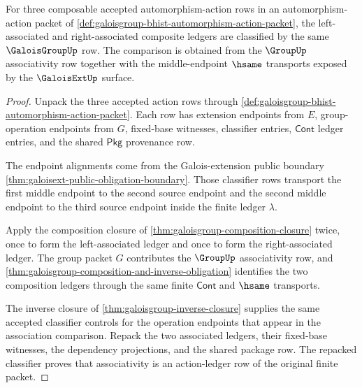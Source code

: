 \begin{theorem}
\label{thm:galoisgroup-associative-composition-row}
For three composable accepted automorphism-action rows in an
automorphism-action packet of
\autoref{def:galoisgroup-bhist-automorphism-action-packet}, the left-associated
and right-associated composite ledgers are classified by the same
$\GaloisGroupUp$ row. The comparison is obtained from the $\GroupUp$
associativity row together with the middle-endpoint $\hsame$ transports exposed
by the $\GaloisExtUp$ surface.
\end{theorem}
\begin{proof}
Unpack the three accepted action rows through
\autoref{def:galoisgroup-bhist-automorphism-action-packet}. Each row has
extension endpoints from $E$, group-operation endpoints from $G$, fixed-base
witnesses, classifier entries, $\mathsf{Cont}$ ledger entries, and the shared
$\mathsf{Pkg}$ provenance row.

The endpoint alignments come from the Galois-extension public boundary
\autoref{thm:galoisext-public-obligation-boundary}. Those classifier rows
transport the first middle endpoint to the second source endpoint and the second
middle endpoint to the third source endpoint inside the finite ledger
$\lambda$.

Apply the composition closure of
\autoref{thm:galoisgroup-composition-closure} twice, once to form the
left-associated ledger and once to form the right-associated ledger. The group
packet $G$ contributes the $\GroupUp$ associativity row, and
\autoref{thm:galoisgroup-composition-and-inverse-obligation} identifies the two
composition ledgers through the same finite $\mathsf{Cont}$ and $\hsame$
transports.

The inverse closure of \autoref{thm:galoisgroup-inverse-closure} supplies the
same accepted classifier controls for the operation endpoints that appear in
the association comparison. Repack the two associated ledgers, their fixed-base
witnesses, the dependency projections, and the shared package row. The repacked
classifier proves that associativity is an action-ledger row of the original
finite packet.
\end{proof}

